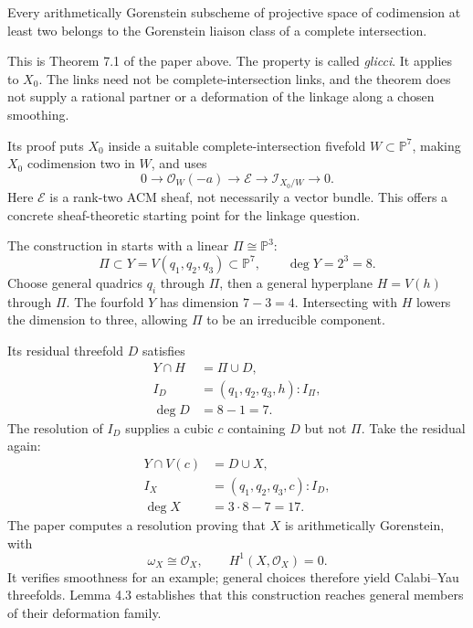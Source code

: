 \begin{theorem}
\label{theorem-ag-glicci}
Every arithmetically Gorenstein subscheme
of projective space of codimension at
least two belongs to the Gorenstein
liaison class of a complete intersection.
\end{theorem}

\noindent
This is Theorem 7.1 of the paper above.
The property is called \emph{glicci}.
It applies to $X_0$.
The links need not be complete-intersection
links, and the theorem does not supply
a rational partner or a deformation of
the linkage along a chosen smoothing.

Its proof puts $X_0$ inside a suitable
complete-intersection fivefold
$W\subset\mathbb{P}^7$, making $X_0$
codimension two in $W$, and uses
$$
0\longrightarrow\mathcal{O}_W(-a)
\longrightarrow\mathcal{E}
\longrightarrow\mathcal{I}_{X_0/W}
\longrightarrow0.
$$
Here $\mathcal{E}$ is a rank-two ACM
sheaf, not necessarily a vector bundle.
This offers a concrete sheaf-theoretic
starting point for the linkage question.

\begin{example}
\label{example-bilinkage-degree-seventeen}
The construction in
\cite[Section 4.4]{luk2} starts with
a linear $\Pi\cong\mathbb{P}^3$:
$$
\Pi\subset Y=V(q_1,q_2,q_3)
\subset\mathbb{P}^7,
\qquad \deg Y=2^3=8.
$$
Choose general quadrics $q_i$ through
$\Pi$, then a general hyperplane
$H=V(h)$ through $\Pi$.
The fourfold $Y$ has dimension $7-3=4$.
Intersecting with $H$ lowers the dimension
to three, allowing $\Pi$ to be an
irreducible component.

Its residual threefold $D$ satisfies
$$
\begin{aligned}
Y\cap H&=\Pi\cup D,\\
I_D&=(q_1,q_2,q_3,h):I_\Pi,\\
\deg D&=8-1=7.
\end{aligned}
$$
The resolution of $I_D$ supplies
a cubic $c$ containing $D$ but not $\Pi$.
Take the residual again:
$$
\begin{aligned}
Y\cap V(c)&=D\cup X,\\
I_X&=(q_1,q_2,q_3,c):I_D,\\
\deg X&=3\cdot8-7=17.
\end{aligned}
$$
The paper computes a resolution proving
that $X$ is arithmetically Gorenstein,
with
$$
\omega_X\cong\mathcal{O}_X,
\qquad H^1(X,\mathcal{O}_X)=0.
$$
It verifies smoothness for an example;
general choices therefore yield
Calabi--Yau threefolds.
Lemma 4.3 establishes that this
construction reaches general members
of their deformation family.
\end{example}

